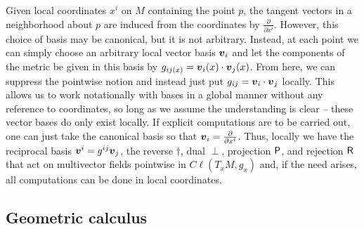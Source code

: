 Given local coordinates $x^i$ on $M$ containing the point $p$, the tangent vectors in a neighborhood about $p$ are induced from the coordinates by $\frac{\partial}{\partial x^i}$. However, this choice of basis may be canonical, but it is not arbitrary. Instead, at each point we can simply choose an arbitrary local vector basis $\boldsymbol{v}_i$ and let the components of the metric be given in this basis by $g_{{ij}(x)} = \boldsymbol{v}_i(x)\cdot \boldsymbol{v}_j(x)$. From here, we can suppress the pointwise notion and instead just put $g_{ij}=\boldsymbol{v}_i\cdot \boldsymbol{v}_j$ locally. This allows us to work notationally with bases in a global manner without any reference to coordinates, so long as we assume the understanding is clear -- these vector bases do only exist locally. If explicit computations are to be carried out, one can just take the canonical basis so that $\boldsymbol{v}_i=\frac{\partial}{\partial x^i}$. Thus, locally we have the reciprocal basis $\boldsymbol{v}^i=g^{ij}\boldsymbol{v}_j$, the reverse $\dagger$, dual $\perp$, projection $\mathsf{P}$, and rejection $\mathsf{R}$ that act on multivector fields pointwise in $C\ell(T_xM,g_x)$ and, if the need arises, all computations can be done in local coordinates. 

\subsection{Geometric calculus}

